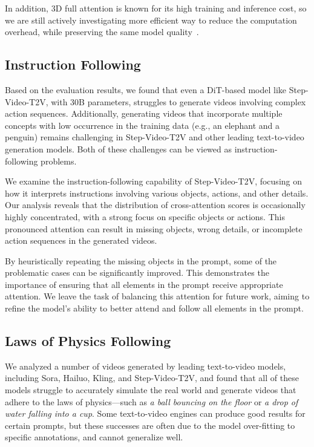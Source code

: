 In addition, 3D full attention is known for its high training and inference cost, so we are still actively investigating more efficient way to reduce the computation overhead, while preserving the same model quality~\cite{dsv}.


\subsection{Instruction Following}


Based on the evaluation results, we found that even a DiT-based model like Step-Video-T2V, with 30B parameters, struggles to generate videos involving complex action sequences. Additionally, generating videos that incorporate multiple concepts with low occurrence in the training data (e.g., an elephant and a penguin) remains challenging in Step-Video-T2V and other leading text-to-video generation models. Both of these challenges can be viewed as instruction-following problems.

We examine the instruction-following capability of Step-Video-T2V, focusing on how it interprets instructions involving various objects, actions, and other details. Our analysis reveals that the distribution of cross-attention scores is occasionally highly concentrated, with a strong focus on specific objects or actions. This pronounced attention can result in missing objects, wrong details, or incomplete action sequences in the generated videos.




By heuristically repeating the missing objects in the prompt, some of the problematic cases can be significantly improved. This demonstrates the importance of ensuring that all elements in the prompt receive appropriate attention. We leave the task of balancing this attention for future work, aiming to refine the model’s ability to better attend and follow all elements in the prompt.

\subsection{Laws of Physics Following}
We analyzed a number of videos generated by leading text-to-video models, including Sora, Hailuo, Kling, and Step-Video-T2V, and found that all of these models struggle to accurately simulate the real world and generate videos that adhere to the laws of physics—such as \textit{a ball bouncing on the floor} or \textit{a drop of water falling into a cup}. Some text-to-video engines can produce good results for certain prompts, but these successes are often due to the model over-fitting to specific annotations, and cannot generalize well. 

